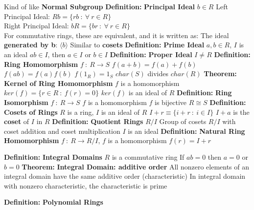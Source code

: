 \documentclass[14pt]{extarticle}
\def\Definition{{\color{blue} \textbf{Definition:} }}
\def\Theorem{{\color{red} \textbf{Theorem:} }}
\begin{document}
\begin{outline}
			\2	Kind of like \textbf{Normal Subgroup}
		\1	\Definition \textbf{Principal Ideal}
			\2	$b \in R$
			\2	Left Principal Ideal:	$Rb = \{rb~:~\forall~r \in R\}$ \\
			\2	Right Principal Ideal:	$bR = \{br~:~\forall~r \in R\}$ \\	
			\2	For commutative rings, these are equivalent, and it is written as:
					The ideal \textbf{generated by b}: $\langle b \rangle$
			\2	Similar to \textbf{cosets}
		\1	\Definition \textbf{Prime Ideal}
			\2	$a,b \in R$, $I$ is an ideal
			\2	$ab \in I$, then $a \in I$ or $b \in I$
		\1	\Definition \textbf{Proper Ideal}
			\2	$I \ne R$	
		\1	\Definition \textbf{Ring Homomorphism}
			\2	$f~:~R \rightarrow S$
			\2	$f(a + b) = f(a) + f(b)$
			\2	$f(ab) = f(a)f(b)$
			\2	$f(1_R) = 1_S$
			\2	$char(S)$ divides $char(R)$
		\1	\Theorem \textbf{Kernel of Ring Homomorphism}
			\2	$f$ is a homomorphism
			\2	$ker(f) = \{r \in R~:~f(r) = 0\}$
			\2	{\color{purple} $ker(f)$ is an ideal of $R$}
		\1	\Definition \textbf{Ring Isomorphism}
			\2	$f~:~R \rightarrow S$
			\2	$f$ is a homomorphism	
			\2	$f$ is bijective
			\2	$R \cong S$
		\1	\Definition \textbf{Cosets of Rings}
			\2	$R$ is a ring, $I$ is an ideal of $R$
			\2	$I + r \equiv \{i + r~:~i \in I\}$
			\2	$I + a$ is the \textbf{coset} of $I$ in $R$	
		\1	\Definition \textbf{Quotient Rings} $R/I$
			\2	Group of cosets $R/I$ with coset addition and coset multiplication
			\2	$I$ is an ideal
		\1	\Definition \textbf{Natural Ring Homomorphism}
			\2	$f~:~R \rightarrow R/I$, $f$ is a homomorphism
			\2	{\color{purple} $f(r) = I + r$}
	
		\1	\Definition \textbf{Integral Domains}
			\2	$R$ is a commutative ring
			\2	If $ab = 0$ then $a = 0$ or $b = 0$
		\1	\Theorem	\textbf{Integral Domain: additive order}
			\2	{\color{purple} All nonzero elements of an integral domain have the same additive order (characteristic)}
			\2	{\color{purple} In integral domain with nonzero characteristic, the characteristic is prime}
		
		\1	\Definition \textbf{Polynomial Rings}

	\end{outline}
\end{document}
